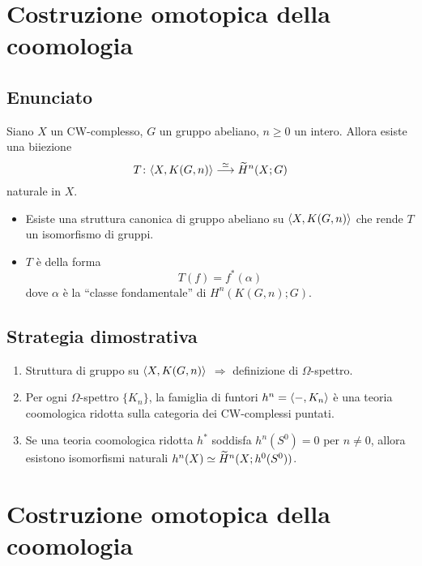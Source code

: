 \documentclass[9pt]{beamer}
\begin{document}
\newcommand*{\statemainresult}{%
\begin{theorem}
Siano $X$ un CW-complesso, $G$ un gruppo abeliano, $n\ge 0$ un intero. Allora esiste una biiezione
\[
\map[\iso]{T}{\hmaps{X,K(G,n)}}{\til{H}^n(X;G)}
\]
naturale in $X$.
\end{theorem}
}
\section*{Costruzione omotopica della coomologia}
\subsection*{Enunciato}
\begin{frame*}
\statemainresult
\begin{itemize}
\item Esiste una struttura canonica di gruppo abeliano su $\langle X,K(G,n)\rangle$ che rende $T$ un isomorfismo di gruppi.
\item $T$ è della forma
\[
T(f)=f^*(\alpha)
\]
dove $\alpha$ è la ``classe fondamentale'' di $H^n(K(G,n);G)$.
\end{itemize}
\end{frame*}

\subsection*{Strategia dimostrativa}
\begin{frame*}
\begin{enumerate}
\addtolength\itemsep{1em}
\item Struttura di gruppo su $\langle X,K(G,n)\rangle$ $\Longrightarrow$ definizione di $\Omega$-spettro.
\item Per ogni $\Omega$-spettro $\{K_n\}$, la famiglia di funtori $h^n=\langle -,K_n\rangle$ è una teoria coomologica ridotta sulla categoria dei CW-complessi puntati.
\item Se una teoria coomologica ridotta $h^*$ soddisfa $h^n(S^0)=0$ per $n\neq 0$, allora esistono isomorfismi naturali $h^n(X)\simeq\widetilde{H}^n(X;h^0(S^0))$.
\end{enumerate}
\end{frame*}





\section*{Costruzione omotopica della coomologia}
\end{document}
